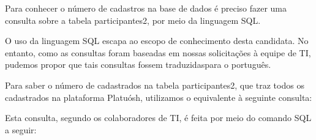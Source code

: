 \documentclass[
12pt,		%
openright,	%
twoside,  %
a4paper,			%
chapter=TITLE,		%
english,			%
french,				%
spanish,			%
brazil				%
]{USPSC-classe/USPSC}
\begin{document}
Para conhecer o n\'umero de cadastros na base de dados \'e preciso fazer uma consulta sobre a tabela \textquotedbl participantes2\textquotedbl , por meio da linguagem SQL.














O uso da linguagem SQL escapa ao escopo de conhecimento desta candidata. No entanto, como as consultas foram baseadas em nossas solicita\c{c}\~oes \`a equipe de TI, pudemos propor que tais consultas fossem \textquotedbl traduzidas\textquotedbl  para o portugu\^es.














Para saber o n\'umero de cadastrados na tabela participantes2, que traz todos os cadastrados na plataforma Platu\'osh, utilizamos o equivalente \`a seguinte consulta:















\noindent\begin{center}\mbox{\centering{}}\end{center}

















Esta consulta, segundo os colaboradores de TI, \'e feita por meio do comando SQL a seguir:
\end{document}
